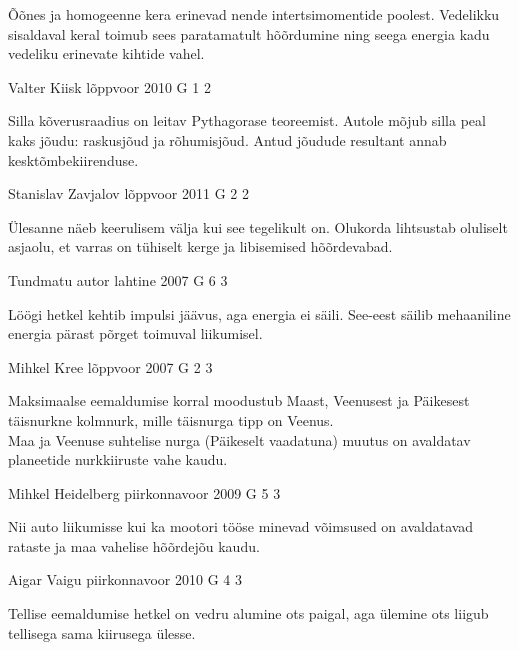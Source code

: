 \documentclass[11pt, twoside]{article}
\begin{document}
{{\ifHint
Õõnes ja homogeenne kera erinevad nende intertsimomentide poolest. Vedelikku sisaldaval keral toimub sees paratamatult hõõrdumine ning seega energia kadu vedeliku erinevate kihtide vahel.
\fi
}

{Valter Kiisk} %
{lõppvoor} %
{2010} %
{G 1} %
{2} %
{

\ifHint
Silla kõverusraadius on leitav Pythagorase teoreemist. Autole mõjub silla peal kaks jõudu: raskusjõud ja rõhumisjõud. Antud jõudude resultant annab kesktõmbekiirenduse.
\fi
}

{Stanislav Zavjalov} %
{lõppvoor} %
{2011} %
{G 2} %
{2} %
{

\ifHint
Ülesanne näeb keerulisem välja kui see tegelikult on. Olukorda lihtsustab oluliselt asjaolu, et varras on tühiselt kerge ja libisemised hõõrdevabad.
\fi
}

{Tundmatu autor} %
{lahtine} %
{2007} %
{G 6} %
{3} %
{

\ifHint
Löögi hetkel kehtib impulsi jäävus, aga energia ei säili. See-eest säilib mehaaniline energia pärast põrget toimuval liikumisel.
\fi
}

{Mihkel Kree} %
{lõppvoor} %
{2007} %
{G 2} %
{3} %
{

\ifHint
\osa Maksimaalse eemaldumise korral moodustub Maast, Veenusest ja Päikesest täisnurkne kolmnurk, mille täisnurga tipp on Veenus.\\
\osa Maa ja Veenuse suhtelise nurga (Päikeselt vaadatuna) muutus on avaldatav planeetide nurkkiiruste vahe kaudu.
\fi
}

{Mihkel Heidelberg} %
{piirkonnavoor} %
{2009} %
{G 5} %
{3} %
{

\ifHint
Nii auto liikumisse kui ka mootori tööse minevad võimsused on avaldatavad rataste ja maa vahelise hõõrdejõu kaudu.
\fi
}

{Aigar Vaigu} %
{piirkonnavoor} %
{2010} %
{G 4} %
{3} %
{

\ifHint
Tellise eemaldumise hetkel on vedru alumine ots paigal, aga ülemine ots liigub tellisega sama kiirusega ülesse.
\fi
}

}
\end{document}
